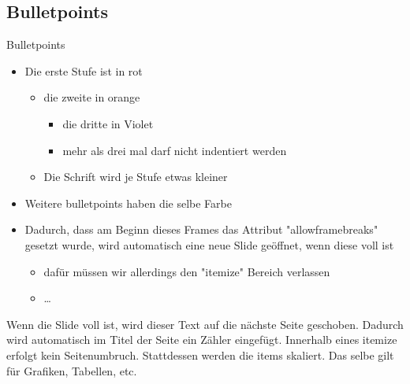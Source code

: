\documentclass{beamer}
\begin{document}
\subsection*{Bulletpoints}\label{sec:itemize}
\begin{frame}[allowframebreaks]{Bulletpoints}
    \begin{itemize}
        \item Die erste Stufe ist in rot
        \begin{itemize}
            \item die zweite in orange
            \begin{itemize}
                \item die dritte in Violet
                \item mehr als drei mal darf nicht indentiert werden
            \end{itemize}    
            \item Die Schrift wird je Stufe etwas kleiner
        \end{itemize}    
        \item Weitere bulletpoints haben die selbe Farbe
        \item Dadurch, dass am Beginn dieses Frames das Attribut "allowframebreaks" gesetzt wurde, wird automatisch eine neue Slide geöffnet, wenn diese voll ist
        \begin{itemize}
            \item dafür müssen wir allerdings den "itemize" Bereich verlassen
            \item \dots
        \end{itemize}
    \end{itemize}
    Wenn die Slide voll ist, wird dieser Text auf die nächste Seite geschoben.
    Dadurch wird automatisch im Titel der Seite ein Zähler eingefügt. 
    Innerhalb eines itemize erfolgt kein Seitenumbruch. 
    Stattdessen werden die items skaliert. 
    Das selbe gilt für Grafiken, Tabellen, etc.
\end{frame}

\end{document}

